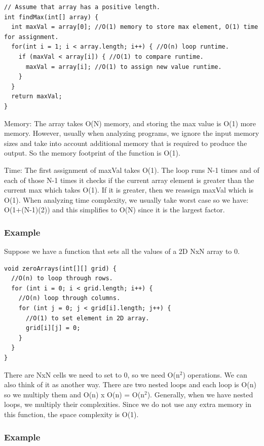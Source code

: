 \documentclass[11pt,oneside]{book}
\begin{document}
\begin{lstlisting}
// Assume that array has a positive length.
int findMax(int[] array) {
  int maxVal = array[0]; //O(1) memory to store max element, O(1) time for assignment.
  for(int i = 1; i < array.length; i++) { //O(n) loop runtime.
    if (maxVal < array[i]) { //O(1) to compare runtime.
      maxVal = array[i]; //O(1) to assign new value runtime.
    }
  }
  return maxVal;
}
\end{lstlisting}

Memory: The array takes O(N) memory, and storing the max value is O(1) more memory. However, usually when analyzing programs, we ignore the input memory sizes and take into account additional memory that is required to produce the output. So the memory footprint of the function is O(1).

Time: The first assignment of maxVal takes O(1). The loop runs N-1 times and of each of those N-1 times it checks if the current array element is greater than the current max which takes O(1). If it is greater, then we reassign maxVal which is O(1). When analyzing time complexity, we usually take worst case so we have: O(1+(N-1)(2)) and this simplifies to O(N) since it is the largest factor.

\subsubsection{Example}

Suppose we have a function that sets all the values of a 2D NxN array to 0.

\begin{lstlisting}
void zeroArrays(int[][] grid) {
  //O(n) to loop through rows.
  for (int i = 0; i < grid.length; i++) {
    //O(n) loop through columns.
    for (int j = 0; j < grid[i].length; j++) {
      //O(1) to set element in 2D array.
      grid[i][j] = 0;
    }
  }
}
\end{lstlisting}

There are NxN cells we need to set to 0, so we need O(n$^{2}$) operations. We can also think of it as another way. There are two nested loops and each loop is O(n) so we multiply them and O(n) x O(n) = O(n$^{2}$). Generally, when we have nested loops, we multiply their complexities. Since we do not use any extra memory in this function, the space complexity is O(1).

\subsubsection{Example}
\end{document}
